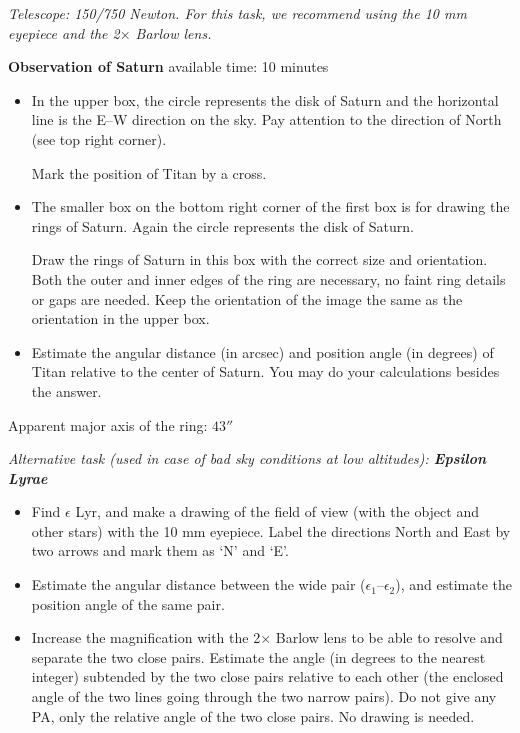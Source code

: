 \emph{Telescope: 150/750 Newton. For this task, we recommend using the 10 mm
eyepiece and the 2$\times$ Barlow lens.}

\textbf{Observation of Saturn} \hfill available time: 10 minutes

\begin{itemize}
\item In the upper box, the circle represents the disk of Saturn and the
  horizontal line is the E--W direction on the sky. Pay attention to the
  direction of North (see top right corner).

  Mark the position of Titan by a cross.
\item The smaller box on the bottom right corner of the first box is for
  drawing the rings of Saturn. Again the circle represents the disk of
  Saturn.

  Draw the rings of Saturn in this box with the correct size and
  orientation. Both the outer and inner edges of the ring are necessary, no
  faint ring details or gaps are needed. Keep the orientation of the image
  the same as the orientation in the upper box.
\item Estimate the angular distance (in arcsec) and position angle (in
  degrees) of Titan relative to the center of Saturn. You may do your
  calculations besides the answer.
\end{itemize}

Apparent major axis of the ring: $43''$


\medskip
\emph{Alternative task (used in case of bad sky conditions at low
altitudes): \textbf{Epsilon Lyrae}}

\begin{itemize}
\item Find $\epsilon$ Lyr, and make a drawing of the field of view (with the
  object and other stars) with the 10 mm eyepiece. Label the directions
  North and East by two arrows and mark them as `N' and `E'.
\item Estimate the angular distance between the wide pair
  ($\epsilon_1$--$\epsilon_2$), and estimate the position angle of the same
  pair.
\item Increase the magnification with the 2$\times$ Barlow lens to be able
  to resolve and separate the two close pairs. Estimate the angle (in
  degrees to the nearest integer) subtended by the two close pairs relative
  to each other (the enclosed angle of the two lines going through the two
  narrow pairs). Do not give any PA, only the relative angle of the two
  close pairs. No drawing is needed.
\end{itemize}

